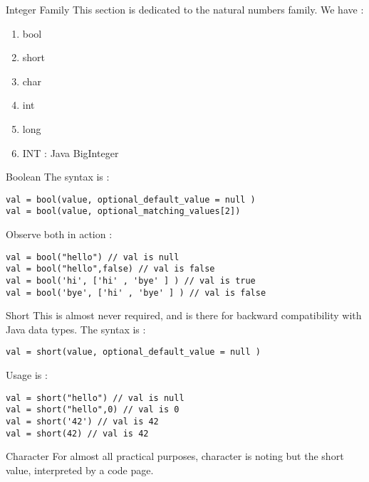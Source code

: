 \begin{section}{Integer Family}
This section is dedicated to the natural numbers family.
We have :
\begin{enumerate}
\item{bool}
\item{short}
\item{char}
\item{int}
\item{long}
\item{INT : Java BigInteger}
\end{enumerate}

\begin{subsection}{Boolean}
The syntax is :
\begin{lstlisting}[style=JexlStyle]
val = bool(value, optional_default_value = null )
val = bool(value, optional_matching_values[2])
\end{lstlisting}
Observe both in action :

\begin{lstlisting}[style=JexlStyle]
val = bool("hello") // val is null
val = bool("hello",false) // val is false
val = bool('hi', ['hi' , 'bye' ] ) // val is true 
val = bool('bye', ['hi' , 'bye' ] ) // val is false 
\end{lstlisting}

\end{subsection}

\begin{subsection}{Short}
This is almost never required, and is there for backward compatibility with Java data types.
The syntax is :

\begin{lstlisting}[style=JexlStyle]
val = short(value, optional_default_value = null )
\end{lstlisting}

Usage is :

\begin{lstlisting}[style=JexlStyle]
val = short("hello") // val is null
val = short("hello",0) // val is 0
val = short('42') // val is 42 
val = short(42) // val is 42 
\end{lstlisting}

\end{subsection}

\begin{subsection}{Character}
For almost all practical purposes, character is noting but the short value, 
interpreted by a code page.


\end{subsection}
\end{section}
